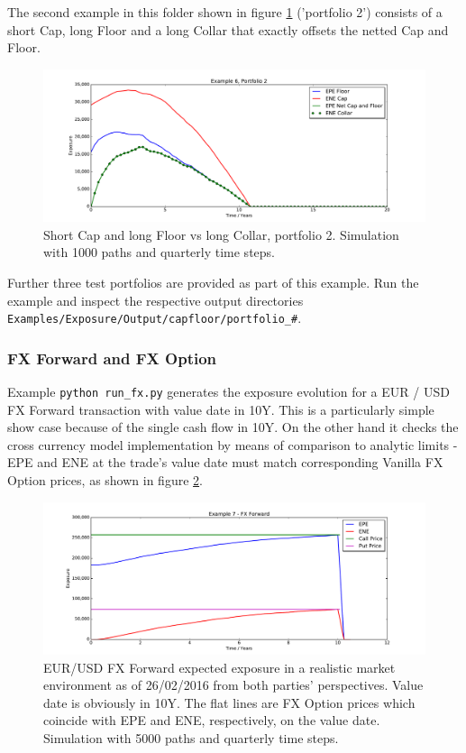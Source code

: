 The second example in this folder shown in figure \ref{fig_capfloor_2} ('portfolio 2') consists of a short Cap, long
Floor and a long Collar that exactly offsets the netted Cap and Floor.

\begin{figure}[h!]
\begin{center}
\includegraphics[scale=0.45]{examples/mpl_capfloor_2.pdf}
\end{center}
\caption{Short Cap and long Floor vs long Collar, portfolio 2. Simulation with 1000 paths and quarterly time steps.}
\label{fig_capfloor_2}
\end{figure}

Further three test portfolios are provided as part of this example. Run the example and inspect the respective output
directories {\tt Examples/Exposure/Output/capfloor/portfolio\_\#}. 

\subsubsection{FX Forward and FX Option}\label{example:exposure_fx}

Example {\tt python run\_fx.py} generates the exposure evolution for a EUR / USD FX Forward transaction
with value date in 10Y. This is a particularly simple show case because of the single cash flow in 10Y. On the other
hand it checks the cross currency model implementation by means of comparison to analytic limits - EPE and ENE at the
trade's value date must match corresponding Vanilla FX Option prices, as shown in figure \ref{fig_5}.
\begin{figure}[h]
\begin{center}
\includegraphics[scale=0.45]{examples/mpl_fxforward.pdf}
\end{center}
\caption{EUR/USD FX Forward expected exposure in a realistic market environment as of 26/02/2016 from both parties'
  perspectives. Value date is obviously in 10Y. The flat lines are FX Option prices which coincide with EPE and ENE,
  respectively, on the value date. Simulation with 5000 paths and quarterly time steps.}
\label{fig_5}
\end{figure}

